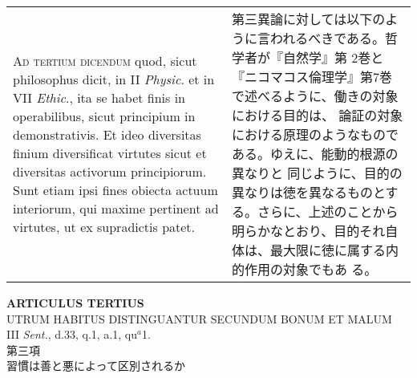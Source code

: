 \documentclass[10pt]{jsarticle} %
\begin{document}
\begin{longtable}{p{21em}p{21em}}
\\



{\scshape Ad tertium dicendum} quod, sicut philosophus dicit, in II
{\itshape Physic}. et in VII {\itshape Ethic}., ita se habet finis in
operabilibus, sicut principium in demonstrativis. Et ideo diversitas
finium diversificat virtutes sicut et diversitas activorum
principiorum. Sunt etiam ipsi fines obiecta actuum interiorum, qui
maxime pertinent ad virtutes, ut ex supradictis patet.

&

第三異論に対しては以下のように言われるべきである。哲学者が『自然学』第
2巻と『ニコマコス倫理学』第7巻で述べるように、働きの対象における目的は、
論証の対象における原理のようなものである。ゆえに、能動的根源の異なりと
同じように、目的の異なりは徳を異なるものとする。さらに、上述のことから
明らかなとおり、目的それ自体は、最大限に徳に属する内的作用の対象でもあ
る。


\end{longtable}
\newpage





\begin{center}
{\Large {\bf ARTICULUS TERTIUS}}\\
{\large UTRUM HABITUS DISTINGUANTUR SECUNDUM BONUM ET MALUM}\\
{\footnotesize III {\itshape Sent.}, d.33, q.1, a.1, qu$^{a}$1.}\\
{\Large 第三項\\習慣は善と悪によって区別されるか}
\end{center}
\end{document}

